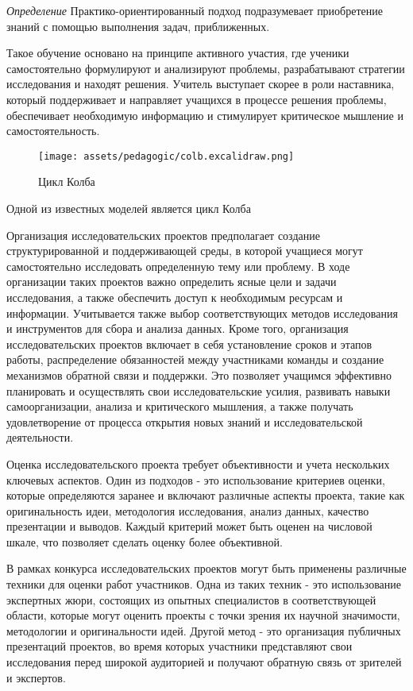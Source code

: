\textit{Определение} Практико-ориентированный подход подразумевает приобретение знаний
 с помощью выполнения задач, приближенных.

Такое обучение основано на принципе активного участия, где ученики самостоятельно формулируют и анализируют проблемы, 
 разрабатывают стратегии исследования и находят решения. 
 Учитель выступает скорее в роли наставника, который поддерживает 
 и направляет учащихся в процессе решения проблемы, обеспечивает необходимую информацию и
 стимулирует критическое мышление и самостоятельность.


\begin{figure}[h]
    \centering
    \texttt{[image: assets/pedagogic/colb.excalidraw.png]}
    \caption{Цикл Колба}
    \label{colb}
\end{figure}

Одной из известных моделей является цикл Колба \cite{kolb2014experiential}



Организация исследовательских проектов предполагает создание структурированной и поддерживающей среды, в которой учащиеся могут самостоятельно исследовать определенную тему или проблему. В ходе организации таких проектов важно определить ясные цели и задачи исследования, а также обеспечить доступ к необходимым ресурсам и информации. Учитывается также выбор соответствующих методов исследования и инструментов для сбора и анализа данных. Кроме того, организация исследовательских проектов включает в себя установление сроков и этапов работы, распределение обязанностей между участниками команды и создание механизмов обратной связи и поддержки. Это позволяет учащимся эффективно планировать и осуществлять свои исследовательские усилия, развивать навыки самоорганизации, анализа и критического мышления, а также получать удовлетворение от процесса открытия новых знаний и исследовательской деятельности.

Оценка исследовательского проекта требует объективности и учета нескольких ключевых аспектов. Один из подходов - это использование критериев оценки, которые определяются заранее и включают различные аспекты проекта, такие как оригинальность идеи, методология исследования, анализ данных, качество презентации и выводов. Каждый критерий может быть оценен на числовой шкале, что позволяет сделать оценку более объективной.

В рамках конкурса исследовательских проектов могут быть применены различные техники для оценки работ участников. Одна из таких техник - это использование экспертных жюри, состоящих из опытных специалистов в соответствующей области, которые могут оценить проекты с точки зрения их научной значимости, методологии и оригинальности идей. Другой метод - это организация публичных презентаций проектов, во время которых участники представляют свои исследования перед широкой аудиторией и получают обратную связь от зрителей и экспертов.

